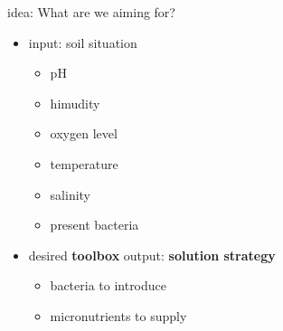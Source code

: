 \documentclass[style=ufz]{powerdot}
\begin{document}
\begin{slide}{idea: What are we aiming for?}
\begin{itemize}
 \item input: soil situation
 \begin{itemize}
  \item pH
  \item himudity
  \item oxygen level
  \item temperature
  \item salinity
  \item present bacteria
   \newline
 \end{itemize}
\pause
{}


 \item desired \textbf{toolbox} output: \textbf{solution strategy}
 \begin{itemize}
  \item bacteria to introduce
  \item micronutrients to supply
 \end{itemize}

\end{itemize}
\end{slide}
\end{document}
